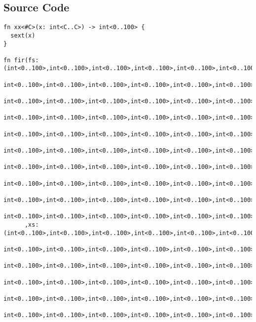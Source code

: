 \documentclass[msc,lith,english]{liuthesis}
\begin{document}
\subsection{Source Code}
\label{source:FIR}
\begin{verbatim}
fn xx<#C>(x: int<C..C>) -> int<0..100> {
  sext(x)
}

fn fir(fs: (int<0..100>,int<0..100>,int<0..100>,int<0..100>,int<0..100>,int<0..100>,int<0..100>,int<0..100>,int<0..100>,int<0..100>,
            int<0..100>,int<0..100>,int<0..100>,int<0..100>,int<0..100>,int<0..100>,int<0..100>,int<0..100>,int<0..100>,int<0..100>,
            int<0..100>,int<0..100>,int<0..100>,int<0..100>,int<0..100>,int<0..100>,int<0..100>,int<0..100>,int<0..100>,int<0..100>,
            int<0..100>,int<0..100>,int<0..100>,int<0..100>,int<0..100>,int<0..100>,int<0..100>,int<0..100>,int<0..100>,int<0..100>,
            int<0..100>,int<0..100>,int<0..100>,int<0..100>,int<0..100>,int<0..100>,int<0..100>,int<0..100>,int<0..100>,int<0..100>,
            int<0..100>,int<0..100>,int<0..100>,int<0..100>,int<0..100>,int<0..100>,int<0..100>,int<0..100>,int<0..100>,int<0..100>,
            int<0..100>,int<0..100>,int<0..100>,int<0..100>,int<0..100>,int<0..100>,int<0..100>,int<0..100>,int<0..100>,int<0..100>,
            int<0..100>,int<0..100>,int<0..100>,int<0..100>,int<0..100>,int<0..100>,int<0..100>,int<0..100>,int<0..100>,int<0..100>,
            int<0..100>,int<0..100>,int<0..100>,int<0..100>,int<0..100>,int<0..100>,int<0..100>,int<0..100>,int<0..100>,int<0..100>,
            int<0..100>,int<0..100>,int<0..100>,int<0..100>,int<0..100>,int<0..100>,int<0..100>,int<0..100>,int<0..100>,int<0..100>)
      ,xs: (int<0..100>,int<0..100>,int<0..100>,int<0..100>,int<0..100>,int<0..100>,int<0..100>,int<0..100>,int<0..100>,int<0..100>,
            int<0..100>,int<0..100>,int<0..100>,int<0..100>,int<0..100>,int<0..100>,int<0..100>,int<0..100>,int<0..100>,int<0..100>,
            int<0..100>,int<0..100>,int<0..100>,int<0..100>,int<0..100>,int<0..100>,int<0..100>,int<0..100>,int<0..100>,int<0..100>,
            int<0..100>,int<0..100>,int<0..100>,int<0..100>,int<0..100>,int<0..100>,int<0..100>,int<0..100>,int<0..100>,int<0..100>,
            int<0..100>,int<0..100>,int<0..100>,int<0..100>,int<0..100>,int<0..100>,int<0..100>,int<0..100>,int<0..100>,int<0..100>,
            int<0..100>,int<0..100>,int<0..100>,int<0..100>,int<0..100>,int<0..100>,int<0..100>,int<0..100>,int<0..100>,int<0..100>,

\end{verbatim}
\end{document}

